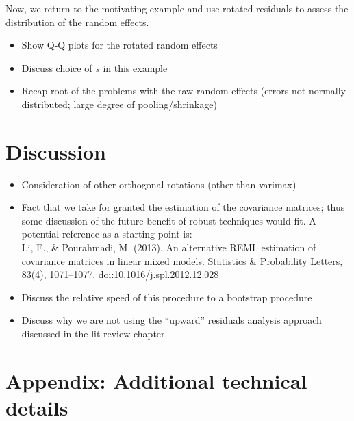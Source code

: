 \documentclass[12pt]{article} %
\begin{document}
Now, we return to the motivating example and use rotated residuals to assess the distribution of the random effects.

\begin{itemize}
\item Show Q-Q plots for the rotated random effects
\item Discuss choice of $s$ in this example
\item Recap root of the problems with the raw random effects (errors not normally distributed; large degree of pooling/shrinkage)
\end{itemize}

\section{Discussion}\label{sec:discussion}

\begin{itemize}
\item Consideration of other orthogonal rotations (other than varimax)
\item Fact that we take for granted the estimation of the covariance matrices; thus some discussion of the future benefit of robust techniques would fit. A potential reference as a starting point is:\\ Li, E., \& Pourahmadi, M. (2013). An alternative REML estimation of covariance matrices in linear mixed models. Statistics \& Probability Letters, 83(4), 1071--1077. doi:10.1016/j.spl.2012.12.028
\item Discuss the relative speed of this procedure to a bootstrap procedure
\item Discuss why we are not using the ``upward'' residuals analysis approach discussed in the lit review chapter.
\end{itemize}

\section*{Appendix: Additional technical details}
\end{document}
